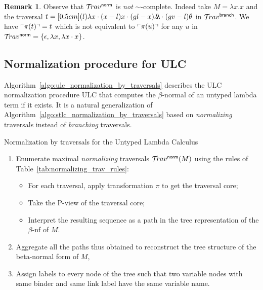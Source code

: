 \documentclass{article}
\theoremstyle{definition}
\newtheorem{remark}{Remark}[section]
\newcommand{\ghostlmd}{{\lambda\!\!\lambda}}
\newcommand{\ghostvar}{\theta}
\newcommand{\normalizing}{{\sf norm}}
\newcommand{\branching}{{\sf branch}}
\newcommand{\travsetbr}{{\travset^\branching}}
\newcommand{\travsetnorm}{\travset^\normalizing}
\def\coresymbol{\pi} %
\newcommand{\core}[1]{\coresymbol(#1)} %
\begin{document}
\begin{remark}
Observe that $\travsetnorm$ is \emph{not} $\sim$-complete. Indeed take $M = \lambda x . x$ and the traversal
$t  = \Pstr[0.5cm]{(l){\lambda x} \cdot (x-l){x} \cdot (gl-x){\ghostlmd} \cdot (gv-l){\ghostvar} }$
 in $\travsetbr$. We have $\pview{\core{t}} = t$ which is not equivalent to  $\pview{\core{u}}$ for any $u$ in $\travsetnorm = \{ \epsilon, \lambda x, \lambda x \cdot x \}$.
\end{remark}

\subsection{Normalization procedure for ULC}

Algorithm~\ref{algo:ulc_normalization_by_traversals} describes the ULC normalization procedure ULC that computes the $\beta$-normal of an untyped lambda term if it exists. It is a natural generalization of Algorithm~\ref{algo:stlc_normalization_by_traversals} based on \emph{normalizing} traversals instead of \emph{branching} traversals.

\begin{algorithm}[!ht]
\begin{algorithmic}
\caption{Normalization by traversals for the Untyped Lambda Calculus}
\label{algo:ulc_normalization_by_traversals}
\begin{enumerate}
  \item Enumerate maximal \emph{normalizing} traversals $\travsetnorm(M)$ using the rules of Table~\ref{tab:normalizing_trav_rules}:
  \begin{itemize}
  \item For each traversal, apply transformation $\coresymbol$ to get the traversal core;
  \item Take the P-view of the traversal core;
  \item Interpret the resulting sequence as a path
  in the tree representation of the $\beta$-nf of $M$.
  \end{itemize}
  \item Aggregate all the paths thus obtained to reconstruct the tree structure of the beta-normal form of $M$,
  \item Assign labels to every node of the tree such that two variable nodes with same binder and same link label have the same variable name.
\end{enumerate}
\end{algorithmic}
\end{algorithm}
\end{document}
